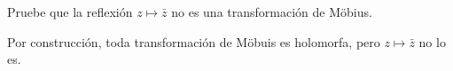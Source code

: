 \begin{exercise}
Pruebe que la reflexión $z \mapsto \bar z$ no es una transformación de Möbius.
\end{exercise}

\begin{solution}
Por construcción, toda transformación de Möbuis es holomorfa, pero $z \mapsto \bar z$ no lo es.
\end{solution}
